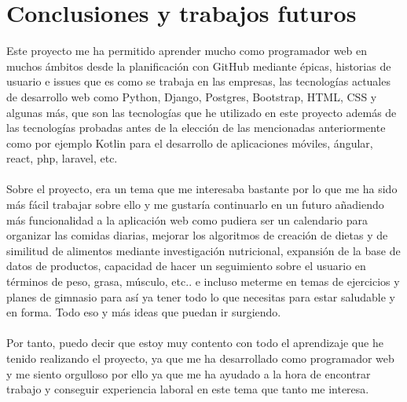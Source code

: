 \chapter{Conclusiones y trabajos futuros}

Este proyecto me ha permitido aprender mucho como programador web en muchos ámbitos desde
la planificación con GitHub mediante épicas, historias de usuario e issues que es como se 
trabaja en las empresas, las tecnologías actuales de desarrollo web como Python, Django, 
Postgres, Bootstrap, HTML, CSS y algunas más, que son las tecnologías que he utilizado en 
este proyecto además de las tecnologías probadas antes de la elección de las mencionadas 
anteriormente como por ejemplo Kotlin para el desarrollo de aplicaciones móviles, ángular, 
react, php, laravel, etc.
\\\\
Sobre el proyecto, era un tema que me interesaba bastante por lo que me ha sido más fácil 
trabajar sobre ello y me gustaría continuarlo en un futuro añadiendo más funcionalidad a 
la aplicación web como pudiera ser un calendario para organizar las comidas diarias, mejorar 
los algoritmos de creación de dietas y de similitud de alimentos mediante investigación 
nutricional, expansión de la base de datos de productos, capacidad de hacer un seguimiento
sobre el usuario en términos de peso, grasa, músculo, etc.. e incluso meterme en temas de 
ejercicios y planes de gimnasio para así ya tener todo lo que necesitas para estar saludable 
y en forma. Todo eso y más ideas que puedan ir surgiendo.
\\\\
Por tanto, puedo decir que estoy muy contento con todo el aprendizaje que he tenido realizando 
el proyecto, ya que me ha desarrollado como programador web y me siento orgulloso por ello ya 
que me ha ayudado a la hora de encontrar trabajo y conseguir experiencia laboral en este tema 
que tanto me interesa.
